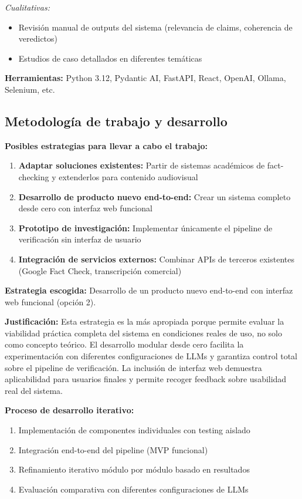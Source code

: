 \documentclass[12pt,a4paper]{article}
\begin{document}
\textit{Cualitativas:}
\begin{itemize}
    \item Revisión manual de outputs del sistema (relevancia de claims, coherencia de veredictos)
    \item Estudios de caso detallados en diferentes temáticas
\end{itemize}

\textbf{Herramientas:} Python 3.12, Pydantic AI, FastAPI, React, OpenAI, Ollama, Selenium, etc.

\subsection{Metodología de trabajo y desarrollo}

\textbf{Posibles estrategias para llevar a cabo el trabajo:}

\begin{enumerate}
    \item \textbf{Adaptar soluciones existentes:} Partir de sistemas académicos de fact-checking y extenderlos para contenido audiovisual
    \item \textbf{Desarrollo de producto nuevo end-to-end:} Crear un sistema completo desde cero con interfaz web funcional
    \item \textbf{Prototipo de investigación:} Implementar únicamente el pipeline de verificación sin interfaz de usuario
    \item \textbf{Integración de servicios externos:} Combinar APIs de terceros existentes (Google Fact Check, transcripción comercial)
\end{enumerate}

\textbf{Estrategia escogida:} Desarrollo de un producto nuevo end-to-end con interfaz web funcional (opción 2).

\textbf{Justificación:} Esta estrategia es la más apropiada porque permite evaluar la viabilidad práctica completa del sistema en condiciones reales de uso, no solo como concepto teórico. El desarrollo modular desde cero facilita la experimentación con diferentes configuraciones de LLMs y garantiza control total sobre el pipeline de verificación. La inclusión de interfaz web demuestra aplicabilidad para usuarios finales y permite recoger feedback sobre usabilidad real del sistema.

\textbf{Proceso de desarrollo iterativo:}
\begin{enumerate}
    \item Implementación de componentes individuales con testing aislado
    \item Integración end-to-end del pipeline (MVP funcional)
    \item Refinamiento iterativo módulo por módulo basado en resultados
    \item Evaluación comparativa con diferentes configuraciones de LLMs
\end{enumerate}
\end{document}
